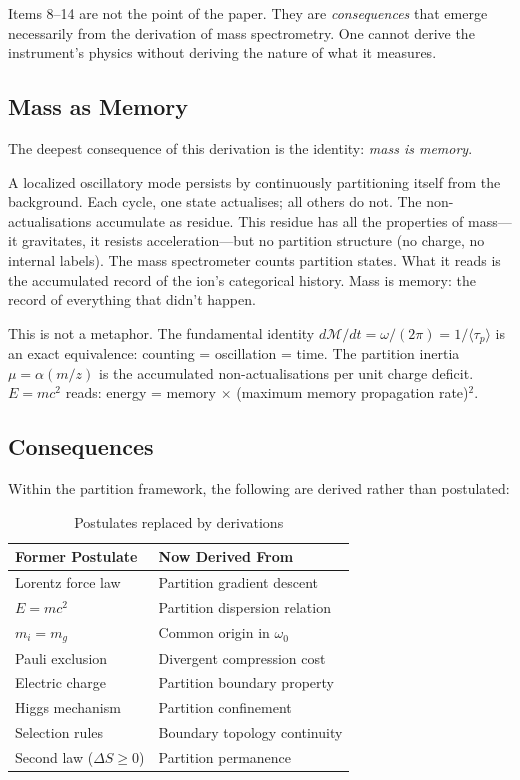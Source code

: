 \documentclass[twocolumn,10pt,a4paper]{article}
\theoremstyle{definition}
\theoremstyle{remark}
\newcommand{\Depth}{\mathcal{M}}
\newcommand{\partinert}{\mu}
\newcommand{\taup}{\tau_p}
\begin{document}
Items 8--14 are not the point of the paper. They are \emph{consequences} that emerge necessarily from the derivation of mass spectrometry. One cannot derive the instrument's physics without deriving the nature of what it measures.

\subsection{Mass as Memory}

The deepest consequence of this derivation is the identity: \emph{mass is memory}.

A localized oscillatory mode persists by continuously partitioning itself from the background. Each cycle, one state actualises; all others do not. The non-actualisations accumulate as residue. This residue has all the properties of mass---it gravitates, it resists acceleration---but no partition structure (no charge, no internal labels). The mass spectrometer counts partition states. What it reads is the accumulated record of the ion's categorical history. Mass is memory: the record of everything that didn't happen.

This is not a metaphor. The fundamental identity $d\Depth/dt = \omega/(2\pi) = 1/\langle\taup\rangle$ is an exact equivalence: counting = oscillation = time. The partition inertia $\partinert = \alpha(m/z)$ is the accumulated non-actualisations per unit charge deficit. $E = mc^2$ reads: energy = memory $\times$ (maximum memory propagation rate)$^2$.

\subsection{Consequences}

Within the partition framework, the following are derived rather than postulated:

\begin{table}[H]
\centering
\caption{Postulates replaced by derivations}
\label{tab:postulates}
\small
\begin{tabular}{ll}
\toprule
\textbf{Former Postulate} & \textbf{Now Derived From} \\
\midrule
Lorentz force law & Partition gradient descent \\
$E = mc^2$ & Partition dispersion relation \\
$m_i = m_g$ & Common origin in $\omega_0$ \\
Pauli exclusion & Divergent compression cost \\
Electric charge & Partition boundary property \\
Higgs mechanism & Partition confinement \\
Selection rules & Boundary topology continuity \\
Second law ($\Delta S \geq 0$) & Partition permanence \\
\bottomrule
\end{tabular}
\end{table}
\end{document}

